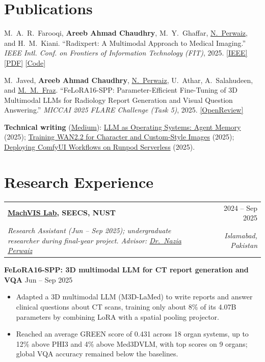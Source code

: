 \documentclass[10pt,letterpaper]{article}
\makeatletter
\newcommand{\entry}[4]{%
  \begin{tabularx}{\textwidth}{@{}X r@{}}
    \textbf{#1} & #2 \\
    \textit{#3} & \textit{#4} \\
  \end{tabularx}}
\newcommand{\NP}{\href{https://scholar.google.com/citations?user=8q5XnWQAAAAJ}{N.~Perwaiz}}
\newcommand{\MMF}{\href{https://scholar.google.com/citations?user=tpfgan0AAAAJ}{M.~M.~Fraz}}
\makeatother
\begin{document}
\section{Publications}
\begin{enumerate}[label={[\arabic*]},leftmargin=2em,itemsep=5pt]
  \item M.~A.~R.~Farooqi, \textbf{Areeb Ahmad Chaudhry}, M.~Y.~Ghaffar, \NP, and H.~M.~Kiani. ``Radixpert: A Multimodal Approach to Medical Imaging.'' \textit{IEEE Intl. Conf. on Frontiers of Information Technology (FIT)}, 2025.
        \href{https://ieeexplore.ieee.org/abstract/document/11333658}{[IEEE]} \href{https://assets.tina.io/1fb09d03-9237-4c49-aaa9-d024a83c7ac7/Radixpert__A_Staged_Adaptation_and_Hierarchical_Fusion_Framework_for_Radiology_VLMs.pdf}{[PDF]} \href{https://github.com/AreebAhmad-02/Radixpertv2}{[Code]}
  \item M.~Javed, \textbf{Areeb Ahmad Chaudhry}, \NP, U.~Athar, A.~Salahudeen, and \MMF. ``FeLoRA16-SPP: Parameter-Efficient Fine-Tuning of 3D Multimodal LLMs for Radiology Report Generation and Visual Question Answering.'' \textit{MICCAI 2025 FLARE Challenge (Task 5)}, 2025.
        \href{https://openreview.net/forum?id=cFrCa5Rvk6}{[OpenReview]}
\end{enumerate}

\textbf{Technical writing} (\href{https://medium.com/@ahmadareeb3026}{Medium}): \href{https://medium.com/@ahmadareeb3026/llm-as-operating-systems-agent-memory-b70c1213a5f7}{LLM as Operating Systems: Agent Memory} (2025); \href{https://medium.com/@ahmadareeb3026/training-wan2-2-for-your-character-custom-style-ultra-realistic-images-f8993350c862}{Training WAN2.2 for Character and Custom-Style Images} (2025); \href{https://medium.com/@ahmadareeb3026/deploying-your-comfyui-workflows-on-the-runpod-serverless-2f0f0a79a8e8}{Deploying ComfyUI Workflows on Runpod Serverless} (2025).

\section{Research Experience}
\entry{\href{https://vision.seecs.edu.pk/}{MachVIS Lab}, SEECS, NUST}{2024 -- Sep 2025}{Research Assistant (Jun -- Sep 2025); undergraduate researcher during final-year project. Advisor: \href{https://scholar.google.com/citations?user=8q5XnWQAAAAJ}{Dr.~Nazia Perwaiz}}{Islamabad, Pakistan}

\vspace{6pt}
\textbf{FeLoRA16-SPP: 3D multimodal LLM for CT report generation and VQA} \hfill Jun -- Sep 2025
\begin{itemize}
  \item Adapted a 3D multimodal LLM (M3D-LaMed) to write reports and answer clinical questions about CT scans, training only about 8\% of its 4.07B parameters by combining LoRA with a spatial pooling projector.
  \item Reached an average GREEN score of 0.431 across 18 organ systems, up to 12\% above PHI3 and 4\% above Med3DVLM, with top scores on 9 organs; global VQA accuracy remained below the baselines.
\end{itemize}
\end{document}
